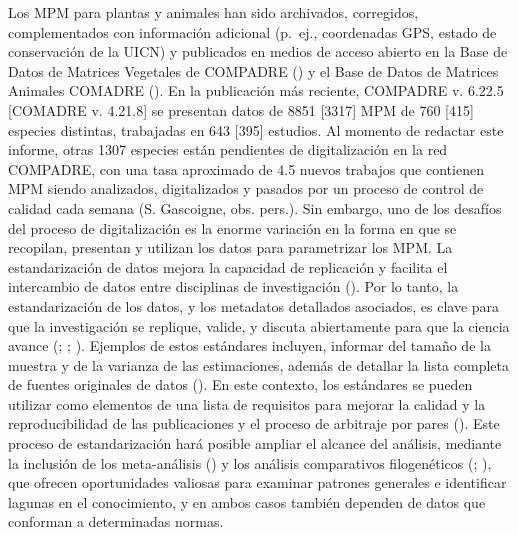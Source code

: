 \documentclass[
]{book}
\theoremstyle{definition}
\theoremstyle{definition}
\theoremstyle{definition}
\theoremstyle{definition}
\theoremstyle{remark}
\begin{document}
Los MPM para plantas y animales han sido archivados, corregidos, complementados con información adicional (p.~ej., coordenadas GPS, estado de conservación de la UICN) y publicados en medios de acceso abierto en la Base de Datos de Matrices Vegetales de COMPADRE (\citet{salguero2015compadre}) y el Base de Datos de Matrices Animales COMADRE (\citet{salguero2016comadre}). En la publicación más reciente, COMPADRE v. 6.22.5 {[}COMADRE v. 4.21.8{]} se presentan datos de 8851 {[}3317{]} MPM de 760 {[}415{]} especies distintas, trabajadas en 643 {[}395{]} estudios. Al momento de redactar este informe, otras 1307 especies están pendientes de digitalización en la red COMPADRE, con una tasa aproximado de 4.5 nuevos trabajos que contienen MPM siendo analizados, digitalizados y pasados por un proceso de control de calidad cada semana (S. Gascoigne, obs. pers.). Sin embargo, uno de los desafíos del proceso de digitalización es la enorme variación en la forma en que se recopilan, presentan y utilizan los datos para parametrizar los MPM. La estandarización de datos mejora la capacidad de replicación y facilita el intercambio de datos entre disciplinas de investigación (\citet{powers2019open}). Por lo tanto, la estandarización de los datos, y los metadatos detallados asociados, es clave para que la investigación se replique, valide, y discuta abiertamente para que la ciencia avance (\citet{powers2019open}; \citet{reichman2011challenges}; \citet{salguero2021four}). Ejemplos de estos estándares incluyen, informar del tamaño de la muestra y de la varianza de las estimaciones, además de detallar la lista completa de fuentes originales de datos (\citet{gerstner2017will}). En este contexto, los estándares se pueden utilizar como elementos de una lista de requisitos para mejorar la calidad y la reproducibilidad de las publicaciones y el proceso de arbitraje por pares (\citet{reichman2011challenges}). Este proceso de estandarización hará posible ampliar el alcance del análisis, mediante la inclusión de los meta-análisis (\citet{gurevitch2018meta}) y los análisis comparativos filogenéticos (\citet{healy2019animal}; \citet{salguero2017fast}), que ofrecen oportunidades valiosas para examinar patrones generales e identificar lagunas en el conocimiento, y en ambos casos también dependen de datos que conforman a determinadas normas.
\end{document}
